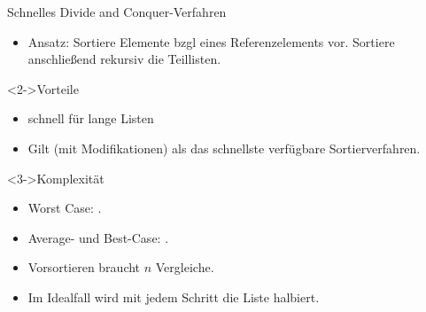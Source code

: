 \begin{frame}
    \begin{block}{Schnelles \alert{Divide and Conquer}-Verfahren}
        \begin{itemize}
            \item Ansatz: Sortiere Elemente bzgl eines Referenzelements vor. Sortiere anschließend rekursiv die Teillisten.
        \end{itemize}
    \end{block}
    \begin{block}<2->{Vorteile}
        \begin{itemize}
            \item schnell für lange Listen
            \item Gilt (mit Modifikationen) als das schnellste verfügbare Sortierverfahren.
        \end{itemize}
    \end{block}
    \begin{block}<3->{Komplexität}
        \begin{itemize}
            \item Worst Case: \alert{\osquare}.
            \item Average- und Best-Case: \alert{\onlog}.
            \item Vorsortieren braucht $n$ Vergleiche.
            \item Im Idealfall wird mit jedem Schritt die Liste halbiert.
        \end{itemize}
    \end{block}
\end{frame}

